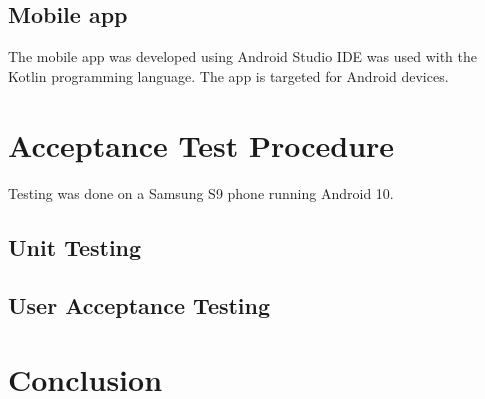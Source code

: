 \documentclass[class=report,11pt,crop=false]{standalone}
\begin{document}
		\subsection{Mobile app}
		The mobile app was developed using Android Studio IDE was used with the Kotlin programming language. The app is targeted for Android devices. 
	
		
	
	
	\section{Acceptance Test Procedure}
	Testing was done on a Samsung S9 phone running Android 10.
	\subsection{Unit Testing}

	
	\subsection{User Acceptance Testing}
	
	\section{Conclusion}
	
	\ifstandalone
	
	\printnoidxglossary[type=\acronymtype,nonumberlist]
	\fi
\end{document}

